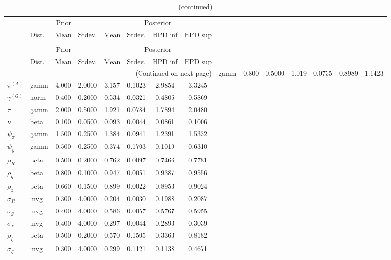  
\begin{center}
\begin{longtable}{llcccccc} 
\caption{Results from Metropolis-Hastings (parameters)}
 \label{Table:MHPosterior:1}\\
\toprule 
  & \multicolumn{3}{c}{Prior}  &  \multicolumn{4}{c}{Posterior} \\
  \cmidrule(r{.75em}){2-4} \cmidrule(r{.75em}){5-8}
  & Dist. & Mean  & Stdev. & Mean & Stdev. & HPD inf & HPD sup\\
\midrule \endfirsthead 
\caption{(continued)}\\\toprule 
  & \multicolumn{3}{c}{Prior}  &  \multicolumn{4}{c}{Posterior} \\
  \cmidrule(r{.75em}){2-4} \cmidrule(r{.75em}){5-8}
  & Dist. & Mean  & Stdev. & Mean & Stdev. & HPD inf & HPD sup\\
\midrule \endhead 
\bottomrule \multicolumn{8}{r}{(Continued on next page)} \endfoot 
\bottomrule \endlastfoot 
${r_{A}}$ & gamm &   0.800 & 0.5000 &   1.019& 0.0735 &  0.8989 &  1.1423 \\ 
${\pi^{(A)}}$ & gamm &   4.000 & 2.0000 &   3.157& 0.1023 &  2.9854 &  3.3245 \\ 
${\gamma^{(Q)}}$ & norm &   0.400 & 0.2000 &   0.534& 0.0321 &  0.4805 &  0.5869 \\ 
${\tau}$ & gamm &   2.000 & 0.5000 &   1.921& 0.0784 &  1.7894 &  2.0480 \\ 
${\nu}$ & beta &   0.100 & 0.0500 &   0.093& 0.0044 &  0.0861 &  0.1006 \\ 
${\psi_\pi}$ & gamm &   1.500 & 0.2500 &   1.384& 0.0941 &  1.2391 &  1.5332 \\ 
${\psi_y}$ & gamm &   0.500 & 0.2500 &   0.374& 0.1703 &  0.1019 &  0.6310 \\ 
${\rho_R}$ & beta &   0.500 & 0.2000 &   0.762& 0.0097 &  0.7466 &  0.7781 \\ 
${\rho_{g}}$ & beta &   0.800 & 0.1000 &   0.947& 0.0051 &  0.9387 &  0.9556 \\ 
${\rho_z}$ & beta &   0.660 & 0.1500 &   0.899& 0.0022 &  0.8953 &  0.9024 \\ 
${\sigma_R}$ & invg &   0.300 & 4.0000 &   0.204& 0.0030 &  0.1988 &  0.2087 \\ 
${\sigma_{g}}$ & invg &   0.400 & 4.0000 &   0.586& 0.0057 &  0.5767 &  0.5955 \\ 
${\sigma_z}$ & invg &   0.400 & 4.0000 &   0.297& 0.0044 &  0.2893 &  0.3039 \\ 
${\rho_\zeta}$ & beta &   0.500 & 0.2000 &   0.570& 0.1505 &  0.3363 &  0.8182 \\ 
${\sigma_\zeta}$ & invg &   0.300 & 4.0000 &   0.299& 0.1121 &  0.1138 &  0.4671 \\ 
\end{longtable}
 \end{center}
